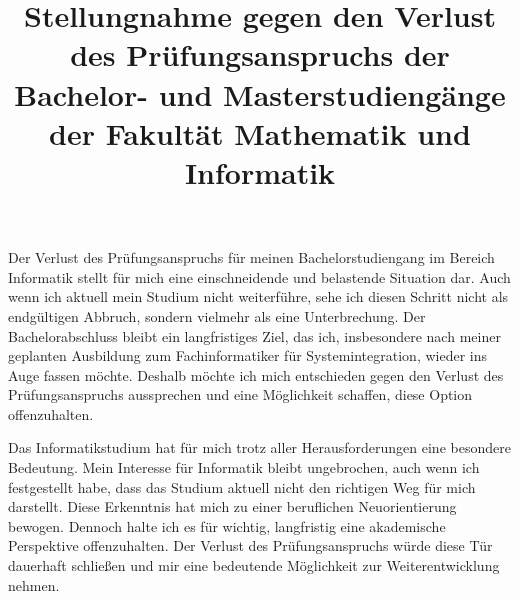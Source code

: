 \documentclass[a4paper,12pt]{article}
\title{Stellungnahme gegen den Verlust des Prüfungsanspruchs der Bachelor- und Masterstudiengänge der Fakultät Mathematik und Informatik}
\author{}
\date{}
\begin{document}
\maketitle

Der Verlust des Prüfungsanspruchs für meinen Bachelorstudiengang im Bereich Informatik stellt für mich eine einschneidende und belastende Situation dar.
Auch wenn ich aktuell mein Studium nicht weiterführe, sehe ich diesen Schritt nicht als endgültigen Abbruch, sondern vielmehr als eine Unterbrechung.
Der Bachelorabschluss bleibt ein langfristiges Ziel, das ich, insbesondere nach meiner geplanten Ausbildung zum Fachinformatiker für Systemintegration, wieder ins Auge fassen möchte.
Deshalb möchte ich mich entschieden gegen den Verlust des Prüfungsanspruchs aussprechen und eine Möglichkeit schaffen, diese Option offenzuhalten.

Das Informatikstudium hat für mich trotz aller Herausforderungen eine besondere Bedeutung.
Mein Interesse für Informatik bleibt ungebrochen, auch wenn ich festgestellt habe, dass das Studium aktuell nicht den richtigen Weg für mich darstellt.
Diese Erkenntnis hat mich zu einer beruflichen Neuorientierung bewogen.
Dennoch halte ich es für wichtig, langfristig eine akademische Perspektive offenzuhalten.
Der Verlust des Prüfungsanspruchs würde diese Tür dauerhaft schließen und mir eine bedeutende Möglichkeit zur Weiterentwicklung nehmen.
\\
\end{document}
